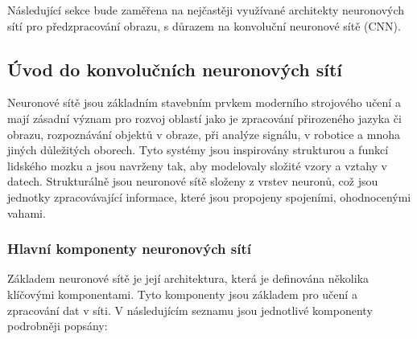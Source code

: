 \documentclass[male,czech,api_ing]{thesis}
\begin{document}
Následující sekce bude zaměřena na nejčastěji využívané architekty neuronových sítí pro předzpracování obrazu, s důrazem na konvoluční neuronové sítě (CNN). \cite{CNNConcepts}

\subsection{Úvod do konvolučních neuronových sítí}
Neuronové sítě jsou základním stavebním prvkem moderního strojového učení a mají zásadní význam pro rozvoj oblastí jako je zpracování přirozeného jazyka či obrazu, rozpoznávání objektů v obraze, při analýze signálu, v robotice a mnoha jiných důležitých oborech. Tyto systémy jsou inspirovány strukturou a funkcí lidského mozku a jsou navrženy tak, aby modelovaly složité vzory a vztahy v datech. Strukturálně jsou neuronové sítě složeny z vrstev neuronů, což jsou jednotky zpracovávající informace, které jsou propojeny spojeními, ohodnocenými vahami.

\subsubsection{Hlavní komponenty neuronových sítí}
Základem neuronové sítě je její architektura, která je definována několika klíčovými komponentami. Tyto komponenty jsou základem pro učení a zpracování dat v síti. V následujícím seznamu jsou jednotlivé komponenty podrobněji popsány:
\end{document}
